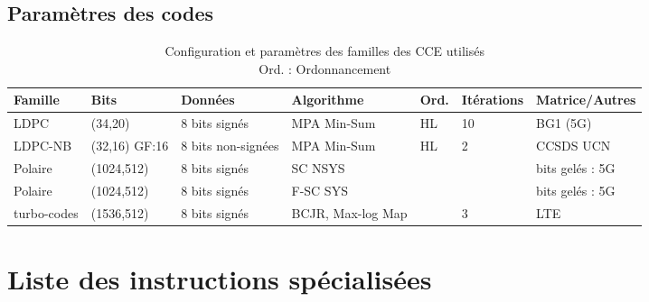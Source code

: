 \documentclass[../main.tex]{subfiles}
\begin{document}
  \subsection{Paramètres des codes}

\begin{table}[]
    \scriptsize
    \centering
    \begin{tabular}{l|l|l|l|l|l|l}
    \toprule
        Famille     & Bits          & Données           & Algorithme    & Ord. & Itérations & Matrice/Autres  \\
        \bottomrule
         LDPC       & (34,20)       & 8 bits signés      & MPA Min-Sum   & HL &  10 & BG1 (5G) \\
         LDPC-NB    & (32,16) GF:16 & 8 bits non-signées & MPA Min-Sum   & HL &  2 & CCSDS UCN \\
         
         
         Polaire    & (1024,512)    & 8 bits signés      & SC NSYS       &    &    & bits gelés : 5G\\
         Polaire    & (1024,512)    & 8 bits signés      & F-SC SYS      &    &    & bits gelés : 5G\\
         turbo-codes& (1536,512)    & 8 bits signés      & BCJR, Max-log Map       &    & 3   & LTE \\
         \bottomrule
    \end{tabular}
    \caption{Configuration et paramètres des familles des CCE utilisés\\
    Ord. : Ordonnancement}
    \label{codes}
\end{table}


\section*{Liste des instructions spécialisées} 

\end{document}
